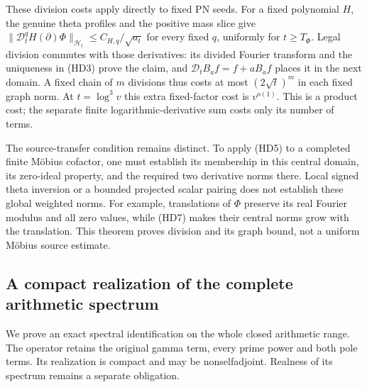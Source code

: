 \documentclass[11pt]{article}
\theoremstyle{remark}\newtheorem{remark}[theorem]{Remark}
\begin{document}
These division costs apply directly to fixed PN seeds.
For a fixed polynomial \(H\), the genuine theta profiles and
the positive mass slice give
\(\|\mathcal D_t^q H(\partial)\Phi\|_{\mathcal H_t}
 \le C_{H,q}/\sqrt{a_t}\) for every fixed \(q\), uniformly
for \(t\ge T_\Phi\).
Legal division commutes with those derivatives: its divided
Fourier transform and the uniqueness in (HD3) prove the claim,
and \(\mathcal D_tB_af=f+aB_af\) places it in the next domain.
A fixed chain of \(m\) divisions thus costs at most
\((2\sqrt t)^m\) in each fixed graph norm.
At \(t=\log^3v\) this extra fixed-factor cost is \(v^{o(1)}\).
This is a product cost; the separate finite logarithmic-derivative
sum costs only its number of terms.

The source-transfer condition remains distinct. To apply (HD5)
to a completed finite M\"obius cofactor, one must establish its
membership in this central domain, its zero-ideal property,
and the required two derivative norms there.
Local signed theta inversion or a bounded projected scalar pairing
does not establish these global weighted norms.
For example, translations of \(\Phi\) preserve its real Fourier
modulus and all zero values, while (HD7) makes their central
norms grow with the translation. This theorem proves division
and its graph bound, not a uniform M\"obius source estimate.

\subsection{A compact realization of the complete arithmetic spectrum}
\label{sec:compact-complete-arithmetic-spectrum}

We prove an exact spectral identification on the whole closed arithmetic
range. The operator retains the original gamma term, every prime power
and both pole terms. Its realization is compact and may be
nonselfadjoint. Realness of its spectrum remains a separate obligation.
\end{document}
